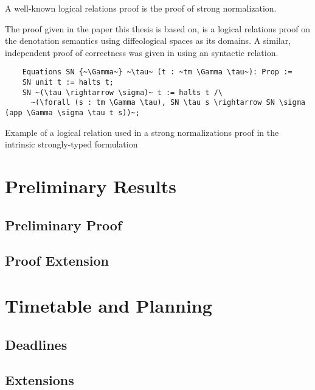 \documentclass[a4, 12pt, final]{article}
\begin{document}
A well-known logical relations proof is the proof of strong normalization.

The proof given in the paper this thesis is based on, is a logical relations proof on the denotation semantics using diffeological spaces as its domains\cite{huot2020correctness}.
A similar, independent proof of correctness was given in \cite{barthe2020versatility} using an syntactic relation.

\begin{listing}
  \begin{verbatim}
    Equations SN {~\Gamma~} ~\tau~ (t : ~tm \Gamma \tau~): Prop :=
    SN unit t := halts t;
    SN ~(\tau \rightarrow \sigma)~ t := halts t /\
      ~(\forall (s : tm \Gamma \tau), SN \tau s \rightarrow SN \sigma (app \Gamma \sigma \tau t s))~;
  \end{verbatim}
  \caption{Example of a logical relation used in a strong normalizations proof in the intrinsic strongly-typed formulation}
  \label{lst:sn_logical_relation}
\end{listing}


\section{Preliminary Results}

\subsection{Preliminary Proof}

\subsection{Proof Extension}

\section{Timetable and Planning}

\subsection{Deadlines}

\subsection{Extensions}
\todo{Fill in}

\printbibliography
% 
\end{document}
